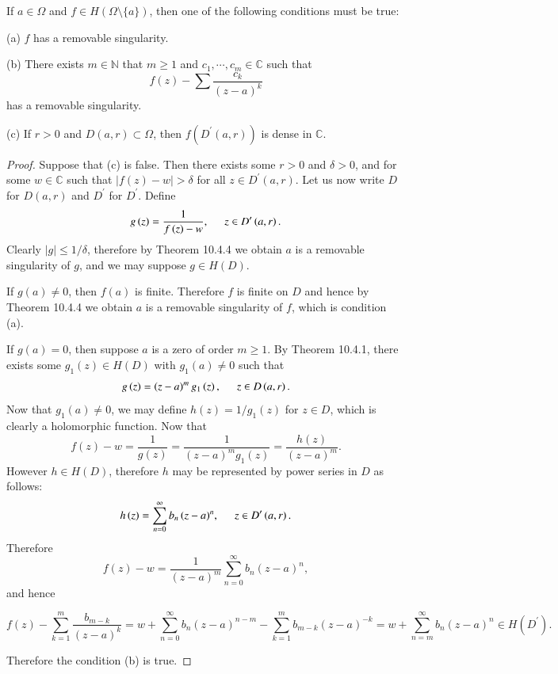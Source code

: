\begin{theorem}
If $a\in\Omega$ and $f\in H(\Omega\setminus\{a\})$, then one of the following conditions must be true:\par
(a) $f$ has a removable singularity.\par
(b) There exists $m\in\mathbb{N}$ that $m\ge 1$ and $c_1,\cdots,c_m\in\mathbb{C}$ such that 
$$
f\left( z \right) -\sum{\frac{c_k}{\left( z-a \right) ^k}}
$$
has a removable singularity.\par
(c) If $r>0$ and $D(a,r)\subset\Omega$, then $f(D^\prime(a,r))$ is dense in $\mathbb{C}$.
\end{theorem}
\begin{proof}
Suppose that (c) is false. Then there exists some $r>0$ and $\delta>0$, and for some $w\in\mathbb{C}$ such that $|f(z)-w|>\delta$ for all $z\in D^\prime(a,r)$. Let us now write $D$ for $D(a,r)$ and $D^\prime$ for $D^\prime$. Define 
$$
g\left( z \right) =\frac{1}{f\left( z \right) -w},\hspace{0.5cm}z\in D^{\prime}\left( a,r \right) .
$$
Clearly $|g|\le 1/\delta$, therefore by Theorem 10.4.4 we obtain $a$ is a removable singularity of $g$, and we may suppose $g\in H(D)$.\par
If $g(a)\ne 0$, then $f(a)$ is finite. Therefore $f$ is finite on $D$ and hence by Theorem 10.4.4 we obtain $a$ is a removable singularity of $f$, which is condition (a).\par
If $g(a)=0$, then suppose $a$ is a zero of order $m\ge 1$. By Theorem 10.4.1, there exists some $g_1(z)\in H(D)$ with $g_1(a)\ne 0$ such that 
$$
g\left( z \right) =\left( z-a \right) ^mg_1\left( z \right) ,\hspace{0.5cm}z\in D\left( a,r \right) .
$$
Now that $g_1(a)\ne 0$, we may define $h(z)=1/g_1(z)$ for $z\in D$, which is clearly a holomorphic function. Now that 
$$
f\left( z \right) -w=\frac{1}{g\left( z \right)}=\frac{1}{\left( z-a \right) ^mg_1\left( z \right)}=\frac{h\left( z \right)}{\left( z-a \right) ^m}.
$$
However $h\in H(D)$, therefore $h$ may be represented by power series in $D$ as follows: 
$$
h\left( z \right) =\sum_{n=0}^{\infty}{b_n\left( z-a \right) ^n},\hspace{0.5cm}z\in D^{\prime}\left( a,r \right) .
$$
Therefore 
$$
f\left( z \right) -w=\frac{1}{\left( z-a \right) ^m}\sum_{n=0}^{\infty}{b_n\left( z-a \right) ^n},
$$
and hence 
\begin{small}
$$
f\left( z \right) -\sum_{k=1}^m{\frac{b_{m-k}}{\left( z-a \right) ^k}}=w+\sum_{n=0}^{\infty}{b_n\left( z-a \right) ^{n-m}}-\sum_{k=1}^m{b_{m-k}\left( z-a \right) ^{-k}}=w+\sum_{n=m}^{\infty}{b_n\left( z-a \right) ^n}\in H\left( D^{\prime} \right) .
$$
\end{small}
Therefore the condition (b) is true.
\end{proof}
